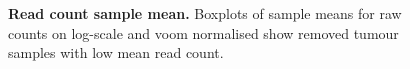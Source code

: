 \begin{figure}[!htp]
         \begin{center}
%
%
    \end{center}
  \caption[Read count sample mean]{\small \textbf{Read count sample mean.} Boxplots of sample means for raw counts on log-scale and voom normalised show removed tumour samples with low mean read count.}
\label{fig:boxplot}
\end{figure}


